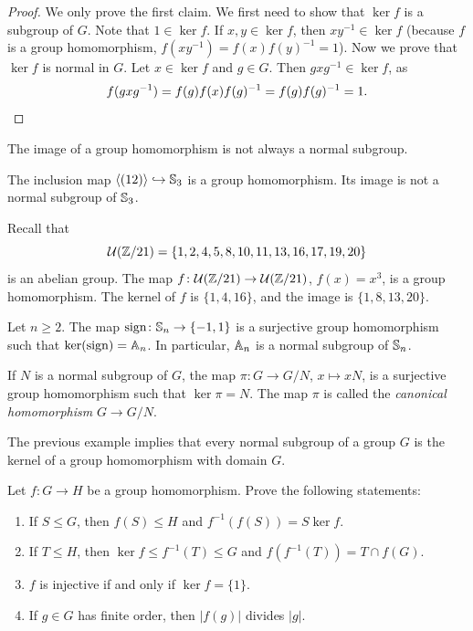 \begin{proof}
    We only prove the first claim. We first need to show that 
    $\ker f$ is a subgroup of $G$. Note that
    $1\in \ker f$. If $x,y\in\ker f$, then
    $xy^{-1}\in\ker f$ (because $f$ is a group homomorphism, 
    $f(xy^{-1})=f(x)f(y)^{-1}=1$). Now we prove that $\ker f$ is normal in $G$. Let $x\in\ker f$ and $g\in G$. Then $gxg^{-1}\in\ker f$, as 
    \[
    f(gxg^{-1})=f(g)f(x)f(g)^{-1}=f(g)f(g)^{-1}=1.\qedhere
    \]
\end{proof}

The image of a group homomorphism
is not always a normal subgroup. 

\begin{example}
The inclusion map $\langle (12)\rangle\hookrightarrow\mathbb{S}_3$ is a group
homomorphism. Its image is not a normal subgroup of $\mathbb{S}_3$.
\end{example}

\begin{example}
\label{exa:U(21)}
Recall that 
\[
\mathcal{U}(\mathbb{Z}/21)=\{1,2,4,5,8,10,11,13,16,17,19,20\}
\]
is an abelian group. The map 
$f\colon\mathcal{U}(\mathbb{Z}/21)\to\mathcal{U}(\mathbb{Z}/21)$, $f(x)=x^3$, is a group
homomorphism. The kernel of $f$ is 
$\{1,4,16\}$, and the 
image is $\{1,8,13,20\}$. 
\end{example}

\begin{example}
Let $n\geq2$. 
The map $\operatorname{sign}\colon\mathbb{S}_n\to\{-1,1\}$ is a surjective group 
homomorphism such that  
$\ker(\operatorname{sign})=\mathbb{A}_n$. In particular, $\mathbb{A}_n$ is a normal subgroup of $\mathbb{S}_n$.
\end{example}

\begin{example}
  If $N$ is a normal subgroup of $G$, the map $\pi\colon G\to G/N$, $x\mapsto xN$, is a surjective group homomorphism such that
  $\ker\pi=N$. The map $\pi$ is called
  the \emph{canonical homomorphism} $G\to G/N$.
\end{example}

The previous example implies that 
every normal subgroup of a group $G$ is the kernel of a group
homomorphism with domain $G$. 


\begin{exercise}
Let $f\colon G\to H$ be a group homomorphism. 
Prove the following statements:
\begin{enumerate}
\item If $S\leq G$, then $f(S)\leq H$ and $f^{-1}(f(S))=S\ker f$.
\item If $T\leq H$, then $\ker f\leq f^{-1}(T)\leq G$ and $f(f^{-1}(T))=T\cap f(G)$.
\item $f$ is injective if and only if $\ker f=\{1\}$.
\item If $g\in G$ has finite order, then $|f(g)|$ divides $|g|$.
\end{enumerate}
\end{exercise}

